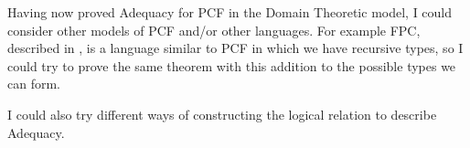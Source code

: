 Having now proved Adequacy for PCF in the Domain Theoretic model, I could consider other models of PCF and/or other languages. For example FPC, described in \citep{Harper16}, is a language similar to PCF in which we have recursive types, so I could try to prove the same theorem with this addition to the possible types we can form.

I could also try different ways of constructing the logical relation to describe Adequacy.










